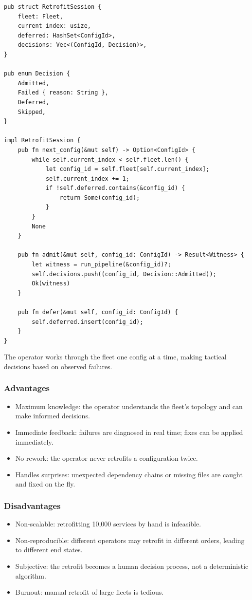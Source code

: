 \begin{lstlisting}[caption={User-driven retrofit interface}]
pub struct RetrofitSession {
    fleet: Fleet,
    current_index: usize,
    deferred: HashSet<ConfigId>,
    decisions: Vec<(ConfigId, Decision)>,
}

pub enum Decision {
    Admitted,
    Failed { reason: String },
    Deferred,
    Skipped,
}

impl RetrofitSession {
    pub fn next_config(&mut self) -> Option<ConfigId> {
        while self.current_index < self.fleet.len() {
            let config_id = self.fleet[self.current_index];
            self.current_index += 1;
            if !self.deferred.contains(&config_id) {
                return Some(config_id);
            }
        }
        None
    }

    pub fn admit(&mut self, config_id: ConfigId) -> Result<Witness> {
        let witness = run_pipeline(&config_id)?;
        self.decisions.push((config_id, Decision::Admitted));
        Ok(witness)
    }

    pub fn defer(&mut self, config_id: ConfigId) {
        self.deferred.insert(config_id);
    }
}
\end{lstlisting}

The operator works through the fleet one config at a time, making tactical decisions based on observed failures.

\subsubsection{Advantages}

\begin{itemize}
  \item Maximum knowledge: the operator understands the fleet's topology and can make informed decisions.
  \item Immediate feedback: failures are diagnosed in real time; fixes can be applied immediately.
  \item No rework: the operator never retrofits a configuration twice.
  \item Handles surprises: unexpected dependency chains or missing files are caught and fixed on the fly.
\end{itemize}

\subsubsection{Disadvantages}

\begin{itemize}
  \item Non-scalable: retrofitting 10,000 services by hand is infeasible.
  \item Non-reproducible: different operators may retrofit in different orders, leading to different end states.
  \item Subjective: the retrofit becomes a human decision process, not a deterministic algorithm.
  \item Burnout: manual retrofit of large fleets is tedious.
\end{itemize}

